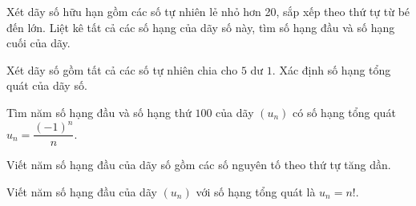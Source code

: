 \begin{bt}[NB]%
	Xét dãy số hữu hạn gồm các số tự nhiên lẻ nhỏ hơn 20, sắp xếp theo thứ tự từ bé đến lớn. Liệt kê tất cả các số hạng của dãy số này, tìm số hạng đầu và số hạng cuối của dãy. 
\end{bt}

\begin{bt}[TH]%
	Xét dãy số gồm tất cả các số tự nhiên chia cho $5$ dư $1$. Xác định số hạng tổng quát của dãy số.
\end{bt}

\begin{bt}[NB]%
	Tìm năm số hạng đầu và số hạng thứ $100$ của dãy $(u_n)$ có số hạng tổng quát $u_n= \dfrac{(-1)^n}{n}$.
\end{bt}

\begin{bt}[NB]%
	Viết năm số hạng đầu của dãy số gồm các số nguyên tố theo thứ tự tăng dần.
\end{bt}

\begin{bt}[NB]%
	Viết năm số hạng đầu của dãy $(u_n)$ với số hạng tổng quát là $u_n=n!$.
\end{bt}

